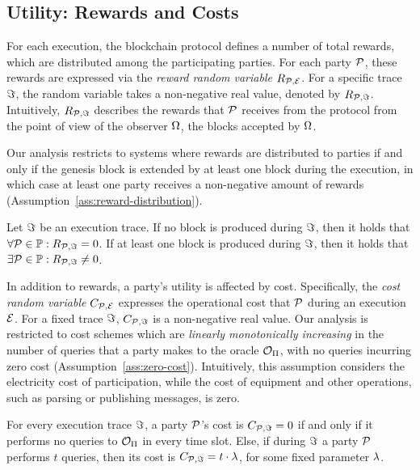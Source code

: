 \subsection{Utility: Rewards and Costs}\label{sec:blockchain-utility}

For each execution, the blockchain protocol defines a number of total rewards,
which are distributed among the participating parties. For each party $\mathcal{P}$,
these rewards are expressed via the \emph{reward random variable}
$R_{\mathcal{P}, \mathcal{E}}$.  For a specific trace $\Im$, the
random variable takes a non-negative real value, denoted by $R_{\mathcal{P},
\Im}$. Intuitively, $R_{\mathcal{P}, \Im}$ describes
the rewards that $\mathcal{P}$ receives from the protocol from the point of view of
the observer $\Omega$, \ie \wrt the blocks accepted by
$\Omega$.

Our analysis restricts to systems where rewards are distributed to parties if
and only if the genesis block is extended by at least one block during the
execution, in which case at least one party receives a non-negative amount of
rewards (Assumption~\ref{ass:reward-distribution}).

\begin{assumption}\label{ass:reward-distribution}
    Let $\Im$ be an execution trace. If no block is produced during $\Im$, then it
    holds that $\forall \mathcal{P} \in \mathbb{P}: R_{\mathcal{P}, \Im} =
    0$.
    If at least one block is produced during $\Im$, then it
    holds that $\exists \mathcal{P} \in \mathbb{P}: R_{\mathcal{P}, \Im} \neq
    0$.
\end{assumption}

In addition to rewards, a party's utility is affected by cost. Specifically,
the \emph{cost random variable} $C_{\mathcal{P}, \mathcal{E}}$ expresses the
operational cost that $\mathcal{P}$ during an execution $\mathcal{E}$. For a fixed
trace $\Im$, $C_{\mathcal{P}, \Im}$ is a non-negative
real value. Our analysis is restricted to cost schemes which are \emph{linearly
monotonically increasing} in the number of queries that a party makes to the
oracle $\mathcal{O}_\Pi$, with no queries incurring zero cost
(Assumption~\ref{ass:zero-cost}). Intuitively, this assumption considers the
electricity cost of participation, while the cost of equipment and other
operations, such as parsing or publishing messages, is zero.

\begin{assumption}\label{ass:zero-cost}
    For every execution trace $\Im$, a party $\mathcal{P}$'s cost is
    $C_{\mathcal{P}, \Im} = 0$ if and only if it performs no queries
    to $\mathcal{O}_\Pi$ in every time slot. Else, if during $\Im$ a party $\mathcal{P}$ performs
    $t$ queries, then its cost is $C_{\mathcal{P}, \Im} = t \cdot \lambda$, for some fixed parameter $\lambda$.
\end{assumption}

